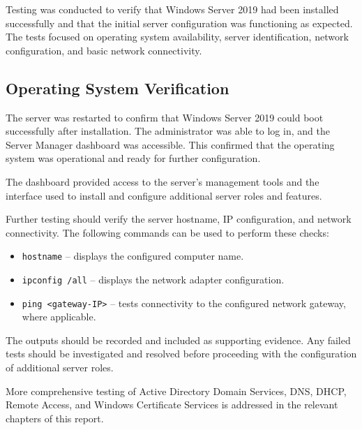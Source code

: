 Testing was conducted to verify that Windows Server 2019 had been installed successfully and that the initial server configuration was functioning as expected. The tests focused on operating system availability, server identification, network configuration, and basic network connectivity.

\subsection{Operating System Verification}

The server was restarted to confirm that Windows Server 2019 could boot successfully after installation. The administrator was able to log in, and the Server Manager dashboard was accessible. This confirmed that the operating system was operational and ready for further configuration.


The dashboard provided access to the server's management tools and the interface used to install and configure additional server roles and features.

Further testing should verify the server hostname, IP configuration, and network connectivity. The following commands can be used to perform these checks:

\begin{itemize}
    \item \texttt{hostname} -- displays the configured computer name.
    \item \texttt{ipconfig /all} -- displays the network adapter configuration.
    \item \texttt{ping \textless{}gateway-IP\textgreater{}} -- tests connectivity to the configured network gateway, where applicable.
\end{itemize}

The outputs should be recorded and included as supporting evidence. Any failed tests should be investigated and resolved before proceeding with the configuration of additional server roles.

More comprehensive testing of Active Directory Domain Services, DNS, DHCP, Remote Access, and Windows Certificate Services is addressed in the relevant chapters of this report.

